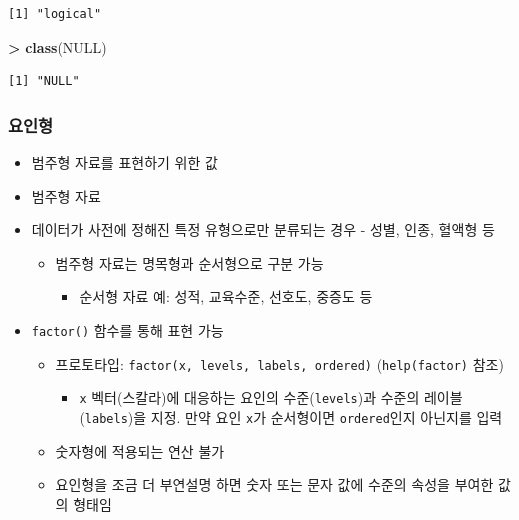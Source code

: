 \documentclass[11pt,a4paper]{book}
\newenvironment{Shaded}{\begin{snugshade}}{\end{snugshade}}
\newcommand{\KeywordTok}[1]{\textcolor[rgb]{0.13,0.29,0.53}{\textbf{#1}}}
\newcommand{\StringTok}[1]{\textcolor[rgb]{0.31,0.60,0.02}{#1}}
\newcommand{\OtherTok}[1]{\textcolor[rgb]{0.56,0.35,0.01}{#1}}
\newcommand{\OperatorTok}[1]{\textcolor[rgb]{0.81,0.36,0.00}{\textbf{#1}}}
\newcommand{\NormalTok}[1]{#1}
\providecommand{\tightlist}{%
  \setlength{\itemsep}{0pt}\setlength{\parskip}{0pt}}
\theoremstyle{definition}
\theoremstyle{definition}
\theoremstyle{definition}
\theoremstyle{remark}
\begin{document}
\begin{verbatim}
[1] "logical"
\end{verbatim}

\begin{Shaded}
\begin{Highlighting}[]
\OperatorTok{>}\StringTok{ }\KeywordTok{class}\NormalTok{(}\OtherTok{NULL}\NormalTok{)}
\end{Highlighting}
\end{Shaded}

\begin{verbatim}
[1] "NULL"
\end{verbatim}

\normalsize

\subsubsection{요인형}

\begin{itemize}
\tightlist
\item
  범주형 자료를 표현하기 위한 값
\item
  범주형 자료
\item
  데이터가 사전에 정해진 특정 유형으로만 분류되는 경우 - 성별, 인종,
  혈액형 등

  \begin{itemize}
  \tightlist
  \item
    범주형 자료는 명목형과 순서형으로 구분 가능

    \begin{itemize}
    \tightlist
    \item
      순서형 자료 예: 성적, 교육수준, 선호도, 중증도 등
    \end{itemize}
  \end{itemize}
\item
  \texttt{factor()} 함수를 통해 표현 가능

  \begin{itemize}
  \tightlist
  \item
    프로토타입: \texttt{factor(x,\ levels,\ labels,\ ordered)}
    (\texttt{help(factor)} 참조)

    \begin{itemize}
    \tightlist
    \item
      \texttt{x} 벡터(스칼라)에 대응하는 요인의 수준(\texttt{levels})과
      수준의 레이블(\texttt{labels})을 지정. 만약 요인 \texttt{x}가
      순서형이면 \texttt{ordered}인지 아닌지를 입력
    \end{itemize}
  \item
    숫자형에 적용되는 연산 불가
  \item
    요인형을 조금 더 부연설명 하면 숫자 또는 문자 값에 수준의 속성을
    부여한 값의 형태임
  \end{itemize}
\end{itemize}
\end{document}
